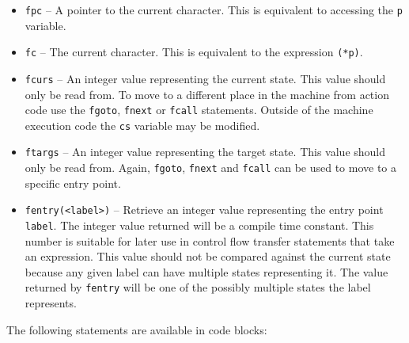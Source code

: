 \documentclass[letterpaper,11pt,oneside]{book}
\begin{document}
\begin{itemize}
\item \verb|fpc| -- A pointer to the current character. This is equivalent to
accessing the \verb|p| variable.

\item \verb|fc| -- The current character. This is equivalent to the expression \verb|(*p)|.

\item \verb|fcurs| -- An integer value representing the current state. This
value should only be read from. To move to a different place in the machine
from action code use the \verb|fgoto|, \verb|fnext| or \verb|fcall| statements.
Outside of the machine execution code the \verb|cs| variable may be modified.

\item \verb|ftargs| -- An integer value representing the target state. This
value should only be read from. Again, \verb|fgoto|, \verb|fnext| and
\verb|fcall| can be used to move to a specific entry point.

\item \verb|fentry(<label>)| -- Retrieve an integer value representing the
entry point \verb|label|. The integer value returned will be a compile time
constant. This number is suitable for later use in control flow transfer
statements that take an expression. This value should not be compared against
the current state because any given label can have multiple states representing
it. The value returned by \verb|fentry| will be one of the possibly multiple states the
label represents.
\end{itemize}

\noindent The following statements are available in code blocks:
\end{document}
